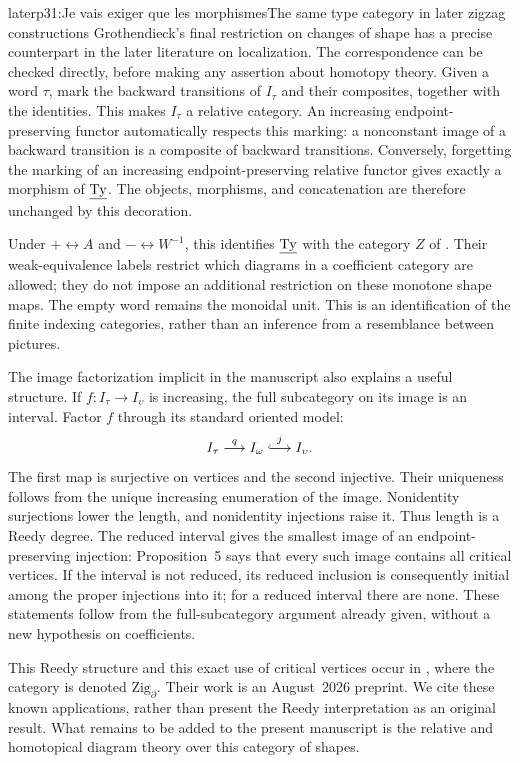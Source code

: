 \begin{dcomment}{later}{p31:Je vais exiger que les morphismes}{The same type category in later zigzag constructions}
Grothendieck's final restriction on changes of shape has a precise counterpart in the later literature on localization. The correspondence can be checked directly, before making any assertion about homotopy theory. Given a word $\tau$, mark the backward transitions of $I_\tau$ and their composites, together with the identities. This makes $I_\tau$ a relative category. An increasing endpoint-preserving functor automatically respects this marking: a nonconstant image of a backward transition is a composite of backward transitions. Conversely, forgetting the marking of an increasing endpoint-preserving relative functor gives exactly a morphism of $\underline{\mathrm{Ty}}$. The objects, morphisms, and concatenation are therefore unchanged by this decoration.

Under $+\leftrightarrow A$ and $-\leftrightarrow W^{-1}$, this identifies $\underline{\mathrm{Ty}}$ with the category $Z$ of \citet[Definition~3.5, Remark~3.6, and footnotes~8--10, pp.~341--342]{MazelGee2018Hammocks}. Their weak-equivalence labels restrict which diagrams in a coefficient category are allowed; they do not impose an additional restriction on these monotone shape maps. The empty word remains the monoidal unit. This is an identification of the finite indexing categories, rather than an inference from a resemblance between pictures.

The image factorization implicit in the manuscript also explains a useful structure. If $f:I_\tau\to I_\upsilon$ is increasing, the full subcategory on its image is an interval. Factor $f$ through its standard oriented model:
\[
 I_\tau\mathrel{\mathop{\longrightarrow}^{q}}I_\omega
 \mathrel{\mathop{\lhook\joinrel\longrightarrow}^{j}}I_\upsilon.
\]
The first map is surjective on vertices and the second injective. Their uniqueness follows from the unique increasing enumeration of the image. Nonidentity surjections lower the length, and nonidentity injections raise it. Thus length is a Reedy degree. The reduced interval gives the smallest image of an endpoint-preserving injection: Proposition~5 says that every such image contains all critical vertices. If the interval is not reduced, its reduced inclusion is consequently initial among the proper injections into it; for a reduced interval there are none. These statements follow from the full-subcategory argument already given, without a new hypothesis on coefficients.

This Reedy structure and this exact use of critical vertices occur in \citet[Example~4.12 and Lemma~4.16]{ArakawaCnossen2026}, where the category is denoted $\mathrm{Zig}_{\partial}$. Their work is an August~2026 preprint. We cite these known applications, rather than present the Reedy interpretation as an original result. What remains to be added to the present manuscript is the relative and homotopical diagram theory over this category of shapes.
\end{dcomment}



